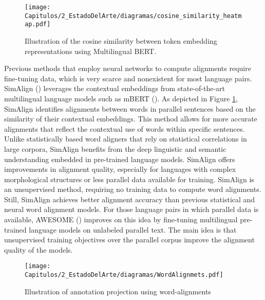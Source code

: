 \begin{figure}
    \centering
    \texttt{[image: Capitulos/2\_EstadoDelArte/diagramas/cosine\_similarity\_heatmap.pdf]}
    \caption{Illustration of the cosine similarity between token embedding representations using Multilingual BERT.}
    \label{fig:chap3_simalign}
\end{figure}

Previous methods that employ neural networks to compute alignments require fine-tuning data, which is very scarce and nonexistent for most language pairs.  SimAlign (\cite{jalili-sabet-etal-2020-simalign}) leverages the contextual embeddings from state-of-the-art multilingual language models such as mBERT (\cite{devlin-etal-2019-bert}). As depicted in Figure \ref{fig:chap3_simalign}, SimAlign identifies alignments between words in parallel sentences based on the similarity of their contextual embeddings. This method allows for more accurate alignments that reflect the contextual use of words within specific sentences. Unlike statistically based word aligners that rely on statistical correlations in large corpora, SimAlign benefits from the deep linguistic and semantic understanding embedded in pre-trained language models. SimAlign offers improvements in alignment quality, especially for languages with complex morphological structures or less parallel data available for training. SimAlign is an unsupervised method, requiring no training data to compute word alignments. Still, SimAlign achieves better alignment accuracy than previous statistical and neural word alignment models. For those language pairs in which parallel data is available, AWESOME (\cite{dou-neubig-2021-word}) improves on this idea by fine-tuning multilingual pre-trained language models on unlabeled parallel text. The main idea is that unsupervised training objectives over the parallel corpus improve the alignment quality of the models.

\begin{figure}
    \centering
    \texttt{[image: Capitulos/2\_EstadoDelArte/diagramas/WordAlignmets.pdf]}
    \caption{Illustration of annotation projection using word-alignments}
    \label{fig:chap3_wordalignments}
\end{figure}

